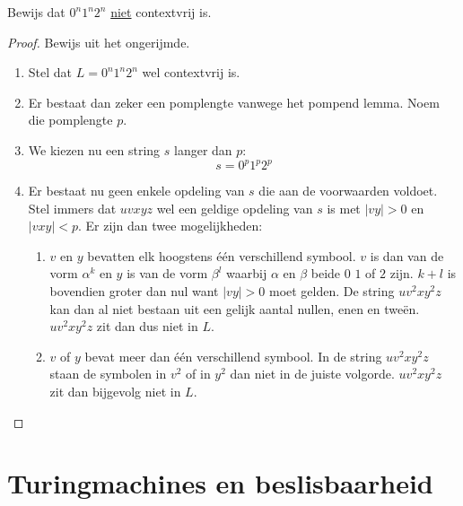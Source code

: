 \documentclass[main.tex]{subfiles}
\begin{document}
\begin{vb}
  \label{vb:0n-1n-2n-niet-contextvrij}
  Bewijs dat $0^{n}1^{n}2^{n}$ \underline{niet} contextvrij is.
  \begin{proof}
    Bewijs uit het ongerijmde.
    \begin{enumerate}
    \item Stel dat $L = 0^{n}1^{n}2^{n}$ wel contextvrij is.
    \item Er bestaat dan zeker een pomplengte vanwege het pompend lemma.
      Noem die pomplengte $p$.
    \item We kiezen nu een string $s$ langer dan $p$:
      \[ s = 0^{p}1^{p}2^{p} \]
    \item Er bestaat nu geen enkele opdeling van $s$ die aan de voorwaarden voldoet.
      Stel immers dat $uvxyz$ wel een geldige opdeling van $s$ is met $|vy| > 0$ en $|vxy| < p$.
      Er zijn dan twee mogelijkheden:
      \begin{enumerate}
      \item $v$ en $y$ bevatten elk hoogstens \'e\'en verschillend symbool.
        $v$ is dan van de vorm $\alpha^{k}$ en $y$ is van de vorm $\beta^{l}$ waarbij $\alpha$ en $\beta$ beide $0$ $1$ of $2$ zijn. 
        $k+l$ is bovendien groter dan nul want $|vy| > 0$ moet gelden.
        De string $uv^{2}xy^{2}z$ kan dan al niet bestaan uit een gelijk aantal nullen, enen en twe\"en.
        $uv^{2}xy^{2}z$ zit dan dus niet in $L$.
      \item $v$ of $y$ bevat meer dan \'e\'en verschillend symbool.
        In de string $uv^{2}xy^{2}z$ staan de symbolen in $v^{2}$ of in $y^{2}$ dan niet in de juiste volgorde.
        $uv^{2}xy^{2}z$ zit dan bijgevolg niet in $L$.
      \end{enumerate}
    \end{enumerate}
  \end{proof}
\end{vb}



\section{Turingmachines en beslisbaarheid}
\label{sec:turingm-en-besl}

\end{document}
